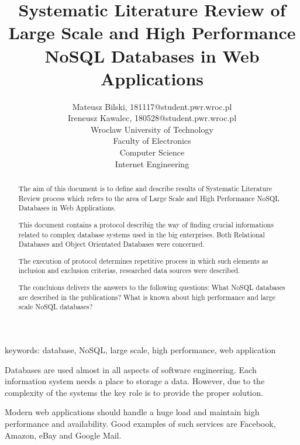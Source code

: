 \documentclass[times, 10pt,twocolumn]{article}
\begin{document}
 

\title{ Systematic Literature Review
       of Large Scale and High Performance NoSQL Databases in Web Applications}
\author{Mateusz Bilski, 181117@student.pwr.wroc.pl \\ Ireneusz Kawalec, 180528@student.pwr.wroc.pl \\ 
Wroclaw University of Technology\\ Faculty of Electronics \\ Computer Science \\ Internet Engineering  \\  
}

\maketitle
\thispagestyle{empty} 

\begin{abstract}  

The aim of this document is to define and describe results of Systematic Literature Review process which 
refers to the area of Large Scale and High Performance NoSQL Databases in Web Applications.

This document contains a protocol describig the way of finding crucial informations related to complex database systems used in the big enterprises.   
Both Relational Databases and Object Orientated Databases were concerned.

The execution of protocol determines repetitive process in which such elements as  
inclusion and exclusion criterias, researched data sources were described. 

The concluions delivers the answers to the following questions:
What NoSQL databases are described in the publications? What is known about high performance and large scale NoSQL databases?

\end{abstract} 

keywords: database, NoSQL, large scale, high performance, web application


Databases are used almost in all aspects of software engineering. Each 
information system needs a place to storage a data. However, due to the complexity of the systems 
the key role is to provide the proper solution.

Modern web applications should handle a huge load and maintain high performance and
availability. Good examples of such services are Facebook, Amazon, eBay and Google Mail.
\end{document}
